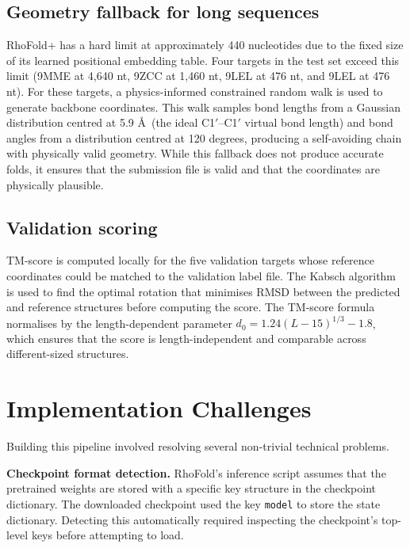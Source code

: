 \documentclass[11pt,a4paper]{article}
\begin{document}
\subsection{Geometry fallback for long sequences}

RhoFold+ has a hard limit at approximately 440 nucleotides due to the fixed size of its learned positional embedding table. Four targets in the test set exceed this limit (9MME at 4,640 nt, 9ZCC at 1,460 nt, 9LEL at 476 nt, and 9LEL at 476 nt). For these targets, a physics-informed constrained random walk is used to generate backbone coordinates. This walk samples bond lengths from a Gaussian distribution centred at 5.9 \AA\ (the ideal C1$'$--C1$'$ virtual bond length) and bond angles from a distribution centred at 120 degrees, producing a self-avoiding chain with physically valid geometry. While this fallback does not produce accurate folds, it ensures that the submission file is valid and that the coordinates are physically plausible.

\subsection{Validation scoring}

TM-score is computed locally for the five validation targets whose reference coordinates could be matched to the validation label file. The Kabsch algorithm is used to find the optimal rotation that minimises RMSD between the predicted and reference structures before computing the score. The TM-score formula normalises by the length-dependent parameter $d_0 = 1.24(L - 15)^{1/3} - 1.8$, which ensures that the score is length-independent and comparable across different-sized structures.

\section{Implementation Challenges}

Building this pipeline involved resolving several non-trivial technical problems.

\textbf{Checkpoint format detection.} RhoFold's inference script assumes that the pretrained weights are stored with a specific key structure in the checkpoint dictionary. The downloaded checkpoint used the key \texttt{model} to store the state dictionary. Detecting this automatically required inspecting the checkpoint's top-level keys before attempting to load.
\end{document}
